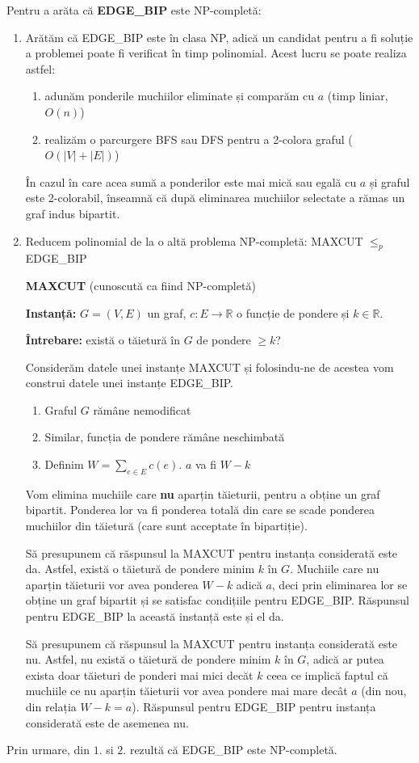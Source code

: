 \documentclass{article}
\begin{document}
{\fontsize{14}{16}\selectfont

Pentru a arăta că \textbf{EDGE\_BIP} este NP-completă:

\begin{enumerate}
    \item Arătăm că EDGE\_BIP este în clasa NP, adică un candidat pentru a fi soluție a problemei poate fi verificat în timp polinomial. Acest lucru se poate realiza astfel:
    \begin{enumerate}
        \item adunăm ponderile muchiilor eliminate și comparăm cu $a$ (timp liniar, $O(n)$)
        \item realizăm o parcurgere BFS sau DFS pentru a 2-colora graful ($O(|V| + |E|)$)
    \end{enumerate}
    În cazul în care acea sumă a ponderilor este mai mică sau egală cu $a$ și graful este 2-colorabil, înseamnă că după eliminarea muchiilor selectate a rămas un graf indus bipartit.
    \item Reducem polinomial de la o altă problema NP-completă: MAXCUT $ \leqslant _p$ EDGE\_BIP
    \par \textbf{MAXCUT} (cunoscută ca fiind NP-completă)
    \par \textbf{Instanță:} $G = (V, E)$ un graf, $c : E \rightarrow \mathbb{R}$ o funcție de pondere și $k \in \mathbb{R}$.
    \par \textbf{Întrebare:} există o tăietură în $G$ de pondere $\geq k$?
    \par Considerăm datele unei instanțe MAXCUT și folosindu-ne de acestea vom construi datele unei instanțe EDGE\_BIP.
    \begin{enumerate}
        \item Graful $G$ rămâne nemodificat
        \item Similar, funcția de pondere rămâne neschimbată
        \item Definim $W = \sum_{e \in E} c(e)$. $a$ va fi $W - k$
    \end{enumerate}
    Vom elimina muchiile care \textbf{nu} aparțin tăieturii, pentru a obține un graf bipartit. Ponderea lor va fi ponderea totală din care se scade ponderea muchiilor din tăietură (care sunt acceptate în bipartiție).
    \par Să presupunem că răspunsul la MAXCUT pentru instanța considerată este da. Astfel, există o tăietură de pondere minim $k$ în $G$. Muchiile care nu aparțin tăieturii vor avea ponderea $W - k$ adică $a$, deci prin eliminarea lor se obține un graf bipartit și se satisfac condițiile pentru EDGE\_BIP. Răspunsul pentru EDGE\_BIP la această instanță este și el da.
    \par Să presupunem că răspunsul la MAXCUT pentru instanța considerată este nu. Astfel, nu există o tăietură de pondere minim $k$ în $G$, adică ar putea exista doar tăieturi de ponderi mai mici decăt $k$ ceea ce implică faptul că muchiile ce nu aparțin tăieturii vor avea pondere mai mare decât $a$ (din nou, din relația $W - k = a$). Răspunsul pentru EDGE\_BIP pentru instanța considerată este de asemenea nu.
\end{enumerate}

Prin urmare, din $1.$ si $2.$ rezultă că EDGE\_BIP este NP-completă.

}
\end{document}
